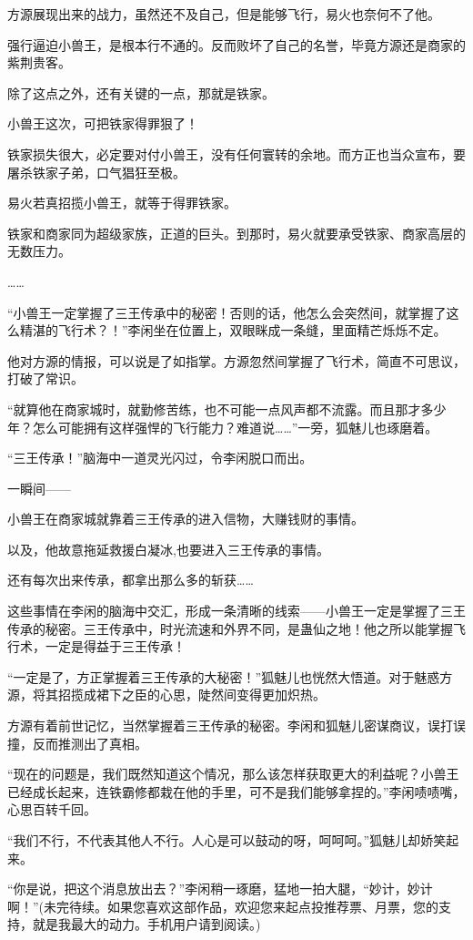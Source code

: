 \begin{this_body}
方源展现出来的战力，虽然还不及自己，但是能够飞行，易火也奈何不了他。

强行逼迫小兽王，是根本行不通的。反而败坏了自己的名誉，毕竟方源还是商家的紫荆贵客。

除了这点之外，还有关键的一点，那就是铁家。

小兽王这次，可把铁家得罪狠了！

铁家损失很大，必定要对付小兽王，没有任何寰转的余地。而方正也当众宣布，要屠杀铁家子弟，口气猖狂至极。

易火若真招揽小兽王，就等于得罪铁家。

铁家和商家同为超级家族，正道的巨头。到那时，易火就要承受铁家、商家高层的无数压力。

……

“小兽王一定掌握了三王传承中的秘密！否则的话，他怎么会突然间，就掌握了这么精湛的飞行术？！”李闲坐在位置上，双眼眯成一条缝，里面精芒烁烁不定。

他对方源的情报，可以说是了如指掌。方源忽然间掌握了飞行术，简直不可思议，打破了常识。

“就算他在商家城时，就勤修苦练，也不可能一点风声都不流露。而且那才多少年？怎么可能拥有这样强悍的飞行能力？难道说……”一旁，狐魅儿也琢磨着。

“三王传承！”脑海中一道灵光闪过，令李闲脱口而出。

一瞬间——

小兽王在商家城就靠着三王传承的进入信物，大赚钱财的事情。

以及，他故意拖延救援白凝冰,也要进入三王传承的事情。

还有每次出来传承，都拿出那么多的斩获……

这些事情在李闲的脑海中交汇，形成一条清晰的线索——小兽王一定是掌握了三王传承的秘密。三王传承中，时光流速和外界不同，是蛊仙之地！他之所以能掌握飞行术，一定是得益于三王传承！

“一定是了，方正掌握着三王传承的大秘密！”狐魅儿也恍然大悟道。对于魅惑方源，将其招揽成裙下之臣的心思，陡然间变得更加炽热。

方源有着前世记忆，当然掌握着三王传承的秘密。李闲和狐魅儿密谋商议，误打误撞，反而推测出了真相。

“现在的问题是，我们既然知道这个情况，那么该怎样获取更大的利益呢？小兽王已经成长起来，连铁霸修都栽在他的手里，可不是我们能够拿捏的。”李闲啧啧嘴，心思百转千回。

“我们不行，不代表其他人不行。人心是可以鼓动的呀，呵呵呵。”狐魅儿却娇笑起来。

“你是说，把这个消息放出去？”李闲稍一琢磨，猛地一拍大腿，“妙计，妙计啊！”(未完待续。如果您喜欢这部作品，欢迎您来起点投推荐票、月票，您的支持，就是我最大的动力。手机用户请到阅读。)

\end{this_body}


